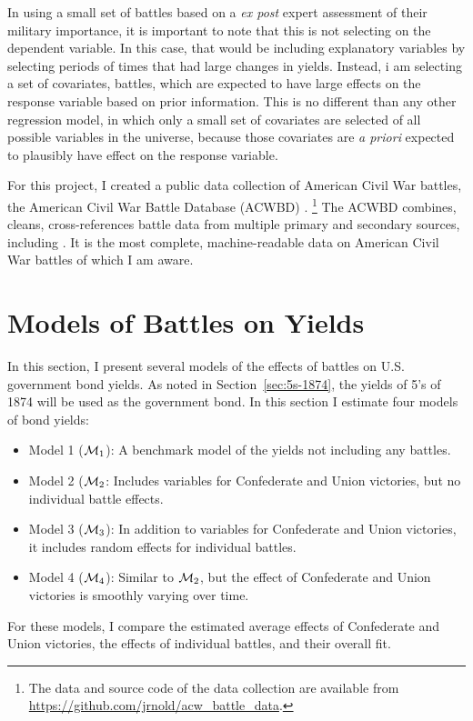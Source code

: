 In using a small set of battles based on a \textit{ex post} expert assessment of their military importance, it is important to note that this is not selecting on the dependent variable.
In this case, that would be including explanatory variables by selecting periods of times that had large changes in yields.
Instead, i am selecting a set of covariates, \ie{} battles, which are expected to have large effects on the response variable based on prior information.
This is no different than any other regression model, in which only a small set of covariates are selected of all possible variables in the universe, because those covariates are \textit{a priori} expected to plausibly have effect on the response variable.

For this project, I created a public data collection of American Civil War battles, the American Civil War Battle Database (ACWBD) \parencite{Arnold2015b}.%
\footnote{The data and source code of the data collection are available from \url{https://github.com/jrnold/acw_battle_data}.}
The ACWBD combines, cleans, cross-references battle data from multiple primary and secondary sources, including \textcites{Phisterer1883}{Livermore1900}{Bodart1908}{dyer1908_war_rebel}{KennedyConservation1998}{CWSAC1993}{cwsac2012}.
It is the most complete, machine-readable data on American Civil War battles of which I am aware.



\section{Models of Battles on Yields}
\label{sec:model-war-events}

In this section, I present several models of the effects of battles on U.S. government bond yields.
As noted in Section~\ref{sec:5s-1874}, the yields of 5's of 1874 will be used as the government bond.
In this section I estimate four models of bond yields:
\begin{itemize}
\item Model 1 ($\mathcal{M}_{\text{1}}$): A benchmark model of the yields not including any battles.
\item Model 2 ($\mathcal{M}_{\text{2}}$: Includes variables for Confederate and Union victories, but no individual battle effects.
\item Model 3 ($\mathcal{M}_{\text{3}}$): In addition to variables for Confederate and Union victories, it includes random effects for individual battles.
\item Model 4 ($\mathcal{M}_{\text{4}}$): Similar to $\mathcal{M}_{\text{2}}$, but the effect of Confederate and Union victories is smoothly varying over time.
\end{itemize}
For these models, I compare the estimated average effects of Confederate and Union victories, the effects of individual battles, and their overall fit.

